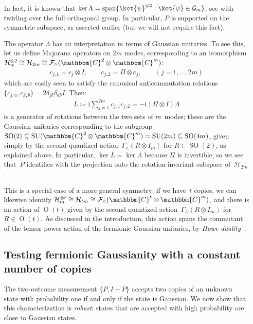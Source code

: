 \documentclass[11pt,a4paper]{article}
\numberwithin{equation}{section}
\newcommand{\ot}{\otimes}
\newcommand{\CC}{\mathbbm{C}}
\newcommand{\HH}{\mathcal{H}}
\newcommand{\id}{I}
\newcommand{\GG}{\mathcal G}
\newcommand{\1}{\mathbf{1}}
\DeclareMathOperator{\SO}{SO}
\DeclareMathOperator{\Ortho}{O}
\DeclareMathOperator{\SU}{SU}
\DeclareMathOperator{\Span}{span}
\begin{document}
\noindent
In fact, it is known that $\ker \Lambda = \Span \{ \ket{\psi}^{\ot 2} : \ket{\psi} \in \GG_m \}$; see \cite[Lem.~A.1]{melo2013power} with twirling over the full orthogonal group.
In particular, $P$ is supported on the symmetric subspace, as asserted earlier (but we will not require this fact).

\smallskip

The operator $\Lambda$ has an interpretation in terms of Gaussian unitaries.
To see this, let us define Majorana operators on $2m$ modes, corresponding to an isomorphism $\HH_m^{\ot 2} \cong \HH_{2m} \cong \mathcal{F}_{\wedge}(\CC^2 \ot \CC^m)$:
\begin{align}\label{eq:two copy majoranas}
    c_{j,1} = c_j\ot\id, \qquad
    c_{j,2} = \Pi\ot c_j,
    \qquad (j=1,\dots,2m)
\end{align}
which are easily seen to satisfy the canonical anticommutation relations $\{c_{j,a},c_{k,b}\} = 2\delta_{jk}\delta_{ab}\id$.
Then:
\begin{align}\label{eq:two copy majorana rotation}
    L
\coloneqq \mathrm{i} \sum_{j=1}^{2m} c_{j,1} c_{j,2}
 = -\mathrm{i} (\Pi \ot I) \Lambda
\end{align}
is a generator of rotations between the two sets of $m$~modes; these are the Gaussian unitaries corresponding to the subgroup $\SO(2) \subseteq \SU(\CC^2 \ot \CC^m) = \SU(2m) \subseteq \SO(4m)$, given simply by the second quantized action~$\Gamma_{\wedge}(R \ot I_m)$ for $R \in \SO(2)$, as explained above.
In particular, $\ker L = \ker \Lambda$ because $\Pi$ is invertible, so we see that~$P$ identifies with the projection onto the rotation-invariant subspace of~$\HH_{2m}$.

This is a special case of a more general symmetry: if we have~$t$ copies, we can likewise identify $\HH_m^{\ot t} \cong \HH_{tm} \cong \mathcal{F}_{\wedge}(\CC^t \ot \CC^m)$, and there is an action of $\Ortho(t)$ given by the second quantized action~$\Gamma_{\wedge}(R \ot I_m)$ for $R \in \Ortho(t)$.
As discussed in the introduction, this action spans the commutant of the tensor power action of the fermionic Gaussian unitaries, by \emph{Howe duality}~\cite{howe1989remarks}.

\subsection{Testing fermionic Gaussianity with a constant number of copies}
The two-outcome measurement $\{P,\id-P\}$ accepts two copies of an unknown state with probability one if and only if the state is Gaussian.
We now show that this characterization is \emph{robust}: states that are accepted with high probability are close to Gaussian states.
\end{document}
